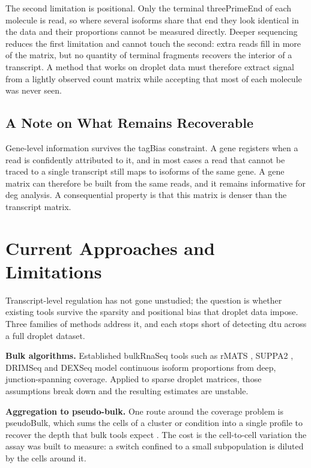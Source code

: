 The second limitation is positional. Only the terminal \gls{threePrimeEnd} of each molecule is read, so where several \glspl{isoform} share that end they look identical in the data and their proportions cannot be measured directly. Deeper sequencing reduces the first limitation and cannot touch the second: extra reads fill in more of the matrix, but no quantity of terminal fragments recovers the interior of a transcript. A method that works on droplet data must therefore extract signal from a lightly observed count matrix while accepting that most of each molecule was never seen.

\subsection*{A Note on What Remains Recoverable}

Gene-level information survives the \gls{tagBias} constraint. A gene registers when a read is confidently attributed to it, and in most cases a read that cannot be traced to a single transcript still maps to isoforms of the same gene. A gene matrix can therefore be built from the same reads, and it remains informative for \gls{deg} analysis. A consequential property is that this matrix is denser than the transcript matrix.

\section{Current Approaches and Limitations}\label{sec:intro-approaches}
Transcript-level regulation has not gone unstudied; the question is whether existing tools survive the sparsity and positional bias that droplet data impose. Three families of methods address it, and each stops short of detecting \gls{dtu} across a full droplet dataset.

\textbf{Bulk algorithms.} Established \gls{bulkRnaSeq} tools such as rMATS \cite{shen2014rmats}, SUPPA2 \cite{trincado2018suppa}, DRIMSeq \cite{nowicka2016drimseq} and DEXSeq \cite{anders2012dexseq} model continuous isoform proportions from deep, junction-spanning coverage. Applied to sparse droplet matrices, those assumptions break down and the resulting estimates are unstable.

\textbf{Aggregation to pseudo-bulk.} One route around the coverage problem is \gls{pseudoBulk}, which sums the cells of a cluster or condition into a single profile to recover the depth that bulk tools expect \cite{gilis2021satuRn, tekath2021dturtle}. The cost is the cell-to-cell variation the assay was built to measure: a switch confined to a small subpopulation is diluted by the cells around it.

